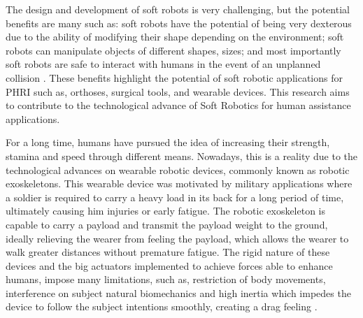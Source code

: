 The design and development of soft robots is very challenging, but the potential benefits are many such as: soft robots have the potential of being very dexterous due to the ability of modifying their shape depending on the environment; soft robots can manipulate objects of different shapes, sizes; and most importantly soft robots are safe to interact with humans in the event of an unplanned collision \cite{iida2011soft}. These benefits highlight the potential of soft robotic applications for PHRI such as, orthoses, surgical tools, and wearable devices. This research aims to contribute to the technological advance of Soft Robotics for human assistance applications.

For a long time, humans have pursued the idea of increasing their strength, stamina and speed through different means. Nowadays, this is a reality due to the technological advances on wearable robotic devices, commonly known as robotic exoskeletons. This wearable device was motivated by military applications where a soldier is required to carry a heavy load in its back for a long period of time, ultimately causing him injuries or early fatigue. The robotic exoskeleton is capable to carry a payload and transmit the payload weight to the ground, ideally relieving the wearer from feeling the payload, which allows the wearer to walk greater distances without premature fatigue. The rigid nature of these devices and the big actuators implemented to achieve forces able to enhance humans, impose many limitations, such as, restriction of body movements, interference on subject natural biomechanics and high inertia which impedes the device to follow the subject intentions smoothly, creating a drag feeling \cite{asbeck2014stronger}.


